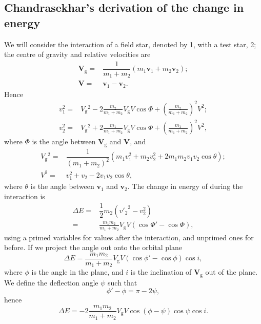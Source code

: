 \documentclass[useAMS,usedcolumn,usegraphicx,usenatbib]{mn2e}
\newcommand{\sub}[1]{\ensuremath{_\mathrm{#1}}}
\newcommand{\recip}[1]{\ensuremath{\dfrac{1}{#1}}}
\begin{document}
\begin{onecolumn}
\subsection{Chandrasekhar's derivation of the change in energy}

We will consider the interaction of a field star, denoted by 1, with a test star, 2; the centre of gravity and relative velocities are
\begin{subequations}
\begin{align}
\boldsymbol{V}\sub{g} = {} & \recip{m_1 + m_2}\left(m_1 \boldsymbol{v}_1 + m_2 \boldsymbol{v}_2\right);\\
\boldsymbol{V} = {} & \boldsymbol{v}_1 - \boldsymbol{v}_2.
\end{align}
\label{eq:Vs}
\end{subequations}
Hence
\begin{subequations}
\begin{align}
v_1^2 = {} & V\sub{g}^2 - 2\frac{m_2}{m_1 + m_2}V\sub{g}V \cos\Phi + \left(\frac{m_2}{m_1 + m_2}\right)^2V^2;\\
v_2^2 = {} & V\sub{g}^2 + 2\frac{m_1}{m_1 + m_2}V\sub{g}V \cos\Phi + \left(\frac{m_1}{m_1 + m_2}\right)^2V^2,
\end{align}
\end{subequations}
where $\Phi$ is the angle between $\boldsymbol{V}\sub{g}$ and $\boldsymbol{V}$, and
\begin{subequations}
\begin{align}
V\sub{g}^2 = {} & \recip{(m_1 + m_2)^2}\left(m_1v_1^2 + m_2v_2^2 + 2 m_1 m_2 v_1 v_2 \cos\theta\right);\\
V^2 = {} & v_1^2 + v_2 - 2 v_1 v_2 \cos\theta,
\end{align}
\label{eq:V2s}
\end{subequations}
where $\theta$ is the angle between $\boldsymbol{v}_1$ and $\boldsymbol{v}_2$. The change in energy of during the interaction is
\begin{align}
\Delta E = {} & \recip{2} m_2 \left({v'_2}^2 - v_2^2\right)\\
 = {} & \frac{m_1 m_2}{m_1 + m_2}V\sub{g}V\left(\cos\Phi' - \cos\Phi\right),
\end{align}
using a primed variables for values after the interaction, and unprimed ones for before. If we project the angle out onto the orbital plane
\begin{equation}
\Delta E = \frac{m_1 m_2}{m_1 + m_2}V\sub{g}V\left(\cos\phi' - \cos\phi\right)\cos i,
\end{equation}
where $\phi$ is the angle in the plane, and $i$ is the inclination of $\boldsymbol{V}\sub{g}$ out of the plane. We define the deflection angle $\psi$ such that
\begin{equation}
\phi' - \phi = \pi - 2\psi,
\end{equation}
hence
\begin{equation}
\Delta E = -2\frac{m_1 m_2}{m_1 + m_2}V\sub{g}V\cos(\phi - \psi)\cos\psi\cos i.
\end{equation}


\end{onecolumn}
\end{document}
